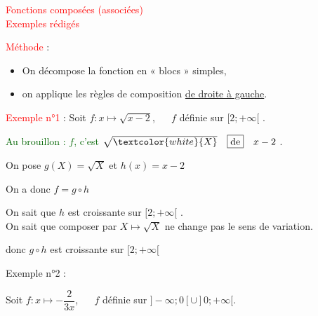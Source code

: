 \usepackage{amsmath,bm}
\usepackage[tikz]{bclogo}





\newcommand{\titre}[1]{\begin{center}{\Large\textcolor{red}{#1}}\end{center}}

\newcommand{\paragraphe}[1]{\large\textcolor{red}{#1}}

\newcommand{\NBVert}[1]{\large\textcolor{DarkGreen}{#1}}

\newcommand{\Attention}[3]{
\begin{bclogo}[%
barre = none,
couleurBord=white,%
logo=\bcattention,%
margeG = -1,%
margeD = 1,%
marge = 15%
]{\textcolor{#1}{$\quad$ #2}}
#3
\end {bclogo}
}

\titre{Fonctions composées (associées)\\
\bigskip
Exemples rédigés}

\paragraphe{Méthode} : \begin{itemize}
\item On décompose la fonction en « blocs » simples, 
\item on applique les règles de composition  \underline{de droite à gauche}.
\end{itemize}

\bigskip 

\paragraphe{Exemple n°1} : Soit $f : x \mapsto \sqrt{x-2}$,   $\quad$   $f$ définie sur $[ 2 ; +\infty [$ . 

\NBVert{Au brouillon : $f$, c'est $\sqrt{\textcolor{white}{X}}\quad  \text{\fbox{de}} \quad x -2$} .

On pose $g(X) = \sqrt{X}$ et $h(x)= x - 2$ 

On a donc $f = g \circ h $ 

On sait que $h$ est croissante sur  $[2; +\infty[$ .\\
On sait que composer par $ X \mapsto  \sqrt{X} $ ne change pas le sens de variation.

donc $ g \circ h $  est croissante sur  $[ 2 ; +\infty [$ 


\Attention{Red}{à l'ordre quand on décompose en blocs !}

\paragraphe{Exemple n°2} :

Soit $f:x\mapsto  - \dfrac{2}{3x}$,  $\quad$   $f$ définie sur $]-\infty ; 0 [ \cup ]0 ; +\infty[$.

